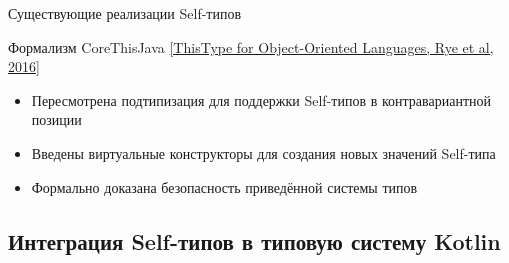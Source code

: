 \documentclass[handout,aspectratio=169,usenames,dvipsnames]{beamer}
\begin{document}
\begin{frame}[fragile]{Существующие реализации Self-типов}
        \begin{block}{Формализм CoreThisJava \href{https://dl.acm.org/doi/pdf/10.1145/2888392}{[ThisType for Object-Oriented Languages, Rye et al, 2016]}}
            \begin{itemize}
                \item Пересмотрена подтипизация для поддержки Self-типов в контравариантной позиции
                \item Введены виртуальные конструкторы для создания новых значений Self-типа
                \item Формально доказана безопасность приведённой системы типов
            \end{itemize}
        \end{block}
    \end{frame}


    \subsection{Интеграция Self-типов в типовую систему Kotlin}
\end{document}
